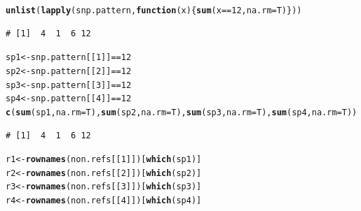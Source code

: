 \documentclass{article}\usepackage[]{graphicx}\usepackage[]{color}
\makeatletter
\newcommand{\hlnum}[1]{\textcolor[rgb]{0.686,0.059,0.569}{#1}}%
\newcommand{\hlopt}[1]{\textcolor[rgb]{0,0,0}{#1}}%
\newcommand{\hlstd}[1]{\textcolor[rgb]{0.345,0.345,0.345}{#1}}%
\newcommand{\hlkwa}[1]{\textcolor[rgb]{0.161,0.373,0.58}{\textbf{#1}}}%
\newcommand{\hlkwb}[1]{\textcolor[rgb]{0.69,0.353,0.396}{#1}}%
\newcommand{\hlkwc}[1]{\textcolor[rgb]{0.333,0.667,0.333}{#1}}%
\newcommand{\hlkwd}[1]{\textcolor[rgb]{0.737,0.353,0.396}{\textbf{#1}}}%
\newenvironment{kframe}{%
 \def\at@end@of@kframe{}%
 \ifinner\ifhmode%
  \def\at@end@of@kframe{\end{minipage}}%
  \begin{minipage}{\columnwidth}%
 \fi\fi%
 \def\FrameCommand##1{\hskip\@totalleftmargin \hskip-\fboxsep
 \colorbox{shadecolor}{##1}\hskip-\fboxsep
     \hskip-\linewidth \hskip-\@totalleftmargin \hskip\columnwidth}%
 \MakeFramed {\advance\hsize-\width
   \@totalleftmargin\z@ \linewidth\hsize
   \@setminipage}}%
 {\par\unskip\endMakeFramed%
 \at@end@of@kframe}
\newenvironment{knitrout}{}{} %
\makeatother
\begin{document}
\begin{knitrout}\footnotesize
{}\color{fgcolor}\begin{kframe}
\begin{alltt}
\hlkwd{unlist}\hlstd{(}\hlkwd{lapply}\hlstd{(snp.pattern,}\hlkwa{function}\hlstd{(}\hlkwc{x}\hlstd{)\{}\hlkwd{sum}\hlstd{(x}\hlopt{==}\hlnum{12}\hlstd{,}\hlkwc{na.rm}\hlstd{=T)\}))}
\end{alltt}
\begin{verbatim}
# [1]  4  1  6 12
\end{verbatim}
\begin{alltt}
\hlstd{sp1} \hlkwb{<-} \hlstd{snp.pattern[[}\hlnum{1}\hlstd{]]}\hlopt{==}\hlnum{12}
\hlstd{sp2} \hlkwb{<-} \hlstd{snp.pattern[[}\hlnum{2}\hlstd{]]}\hlopt{==}\hlnum{12}
\hlstd{sp3} \hlkwb{<-} \hlstd{snp.pattern[[}\hlnum{3}\hlstd{]]}\hlopt{==}\hlnum{12}
\hlstd{sp4} \hlkwb{<-} \hlstd{snp.pattern[[}\hlnum{4}\hlstd{]]}\hlopt{==}\hlnum{12}
\hlkwd{c}\hlstd{(}\hlkwd{sum}\hlstd{(sp1,}\hlkwc{na.rm}\hlstd{=T),} \hlkwd{sum}\hlstd{(sp2,}\hlkwc{na.rm}\hlstd{=T),} \hlkwd{sum}\hlstd{(sp3,}\hlkwc{na.rm}\hlstd{=T),} \hlkwd{sum}\hlstd{(sp4,}\hlkwc{na.rm}\hlstd{=T))}
\end{alltt}
\begin{verbatim}
# [1]  4  1  6 12
\end{verbatim}
\begin{alltt}
\hlstd{r1} \hlkwb{<-} \hlkwd{rownames}\hlstd{(non.refs[[}\hlnum{1}\hlstd{]])[}\hlkwd{which}\hlstd{(sp1)]}
\hlstd{r2} \hlkwb{<-} \hlkwd{rownames}\hlstd{(non.refs[[}\hlnum{2}\hlstd{]])[}\hlkwd{which}\hlstd{(sp2)]}
\hlstd{r3} \hlkwb{<-} \hlkwd{rownames}\hlstd{(non.refs[[}\hlnum{3}\hlstd{]])[}\hlkwd{which}\hlstd{(sp3)]}
\hlstd{r4} \hlkwb{<-} \hlkwd{rownames}\hlstd{(non.refs[[}\hlnum{4}\hlstd{]])[}\hlkwd{which}\hlstd{(sp4)]}


\end{alltt}
\end{kframe}
\end{knitrout}
\end{document}

